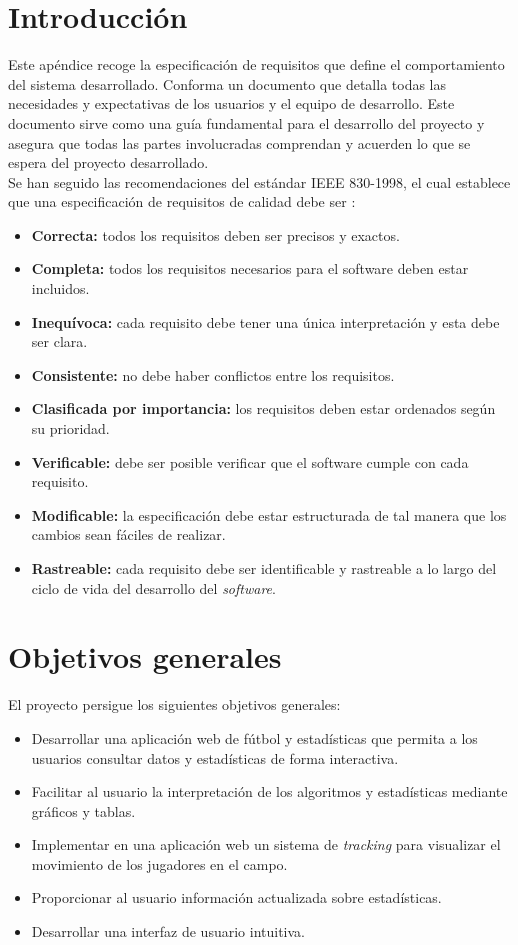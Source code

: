 
\section{Introducción}

Este apéndice recoge la especificación de requisitos que define el comportamiento del sistema desarrollado. Conforma un documento que detalla todas las necesidades y expectativas de los usuarios y el equipo de desarrollo. Este documento sirve como una guía fundamental para el desarrollo del proyecto y asegura que todas las partes involucradas comprendan y acuerden lo que se espera del proyecto desarrollado. \\
Se han seguido las recomendaciones del estándar IEEE 830-1998, el cual establece que una especificación de requisitos de calidad debe ser \cite{IEEE:latex}:
\begin{itemize}
    \item \textbf{Correcta:} todos los requisitos deben ser precisos y exactos.
    \item \textbf{Completa:} todos los requisitos necesarios para el software deben estar incluidos.
    \item \textbf{Inequívoca:} cada requisito debe tener una única interpretación y esta debe ser clara.
    \item \textbf{Consistente:} no debe haber conflictos entre los requisitos.
    \item \textbf{Clasificada por importancia:} los requisitos deben estar ordenados según su prioridad.
    \item \textbf{Verificable:} debe ser posible verificar que el software cumple con cada requisito.
    \item \textbf{Modificable:} la especificación debe estar estructurada de tal manera que los cambios sean fáciles de realizar.
    \item \textbf{Rastreable:} cada requisito debe ser identificable y rastreable a lo largo del ciclo de vida del desarrollo del \textit{software}. 
\end{itemize}

\section{Objetivos generales}
El proyecto persigue los siguientes objetivos generales:
\begin{itemize}
    \item Desarrollar una aplicación web de fútbol y estadísticas que permita a los usuarios consultar datos y estadísticas de forma interactiva.
    \item Facilitar al usuario la interpretación de los algoritmos y estadísticas mediante gráficos y tablas.
    \item Implementar en una aplicación web un sistema de \textit{tracking} para visualizar el movimiento de los jugadores en el campo.
    \item Proporcionar al usuario información actualizada sobre estadísticas.
    \item Desarrollar una interfaz de usuario intuitiva.
\end{itemize}

